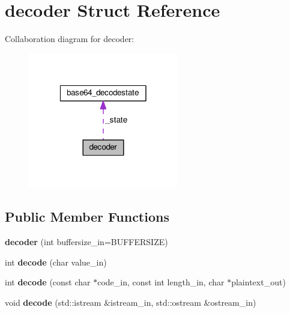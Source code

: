 \hypertarget{structbase64_1_1decoder}{\section{decoder Struct Reference}
\label{structbase64_1_1decoder}
}


Collaboration diagram for decoder\-:\nopagebreak
\begin{figure}[H]
\begin{center}
\leavevmode
\includegraphics[width=186pt]{structbase64_1_1decoder__coll__graph}
\end{center}
\end{figure}
\subsection*{Public Member Functions}
\begin{DoxyCompactItemize}
\item 
\hypertarget{structbase64_1_1decoder_afb1a3c0484762c72b2c1a9500a30f63a}{{\bfseries decoder} (int buffersize\-\_\-in=B\-U\-F\-F\-E\-R\-S\-I\-Z\-E)}\label{structbase64_1_1decoder_afb1a3c0484762c72b2c1a9500a30f63a}

\item 
\hypertarget{structbase64_1_1decoder_a6542188945ec1885416c0725ab0b9e11}{int {\bfseries decode} (char value\-\_\-in)}\label{structbase64_1_1decoder_a6542188945ec1885416c0725ab0b9e11}

\item 
\hypertarget{structbase64_1_1decoder_ae569f424cafa612fd0871f0d7f0b433a}{int {\bfseries decode} (const char $\ast$code\-\_\-in, const int length\-\_\-in, char $\ast$plaintext\-\_\-out)}\label{structbase64_1_1decoder_ae569f424cafa612fd0871f0d7f0b433a}

\item 
\hypertarget{structbase64_1_1decoder_a02f06a7109ed4e6da96350242f5051b2}{void {\bfseries decode} (std\-::istream \&istream\-\_\-in, std\-::ostream \&ostream\-\_\-in)}\label{structbase64_1_1decoder_a02f06a7109ed4e6da96350242f5051b2}

\end{DoxyCompactItemize}
